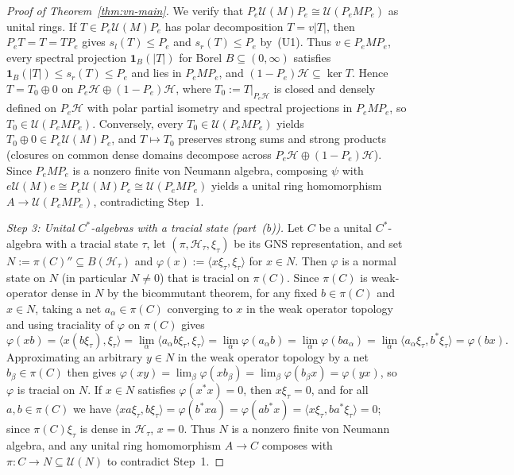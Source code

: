 \documentclass[11pt]{article}
\theoremstyle{definition}
\theoremstyle{remark}
\numberwithin{equation}{section}
\newcommand{\U}{\mathcal{U}}
\newcommand{\HH}{\mathcal{H}}
\newcommand{\1}{\mathbf{1}}
\begin{document}
\begin{proof}[Proof of Theorem~\ref{thm:vn-main}]
We verify that $P_e\U(M)P_e \cong \U(P_e M P_e)$ as unital rings. If $T \in P_e\U(M)P_e$ has polar decomposition $T = v|T|$, then $P_e T = T = T P_e$ gives $s_l(T) \le P_e$ and $s_r(T) \le P_e$ by~(U1). Thus $v \in P_e M P_e$, every spectral projection $\1_B(|T|)$ for Borel $B \subseteq (0, \infty)$ satisfies $\1_B(|T|) \le s_r(T) \le P_e$ and lies in $P_e M P_e$, and $(1 - P_e)\HH \subseteq \ker T$. Hence $T = T_0 \oplus 0$ on $P_e\HH \oplus (1 - P_e)\HH$, where $T_0 := T|_{P_e\HH}$ is closed and densely defined on $P_e\HH$ with polar partial isometry and spectral projections in $P_e M P_e$, so $T_0 \in \U(P_e M P_e)$. Conversely, every $T_0 \in \U(P_e M P_e)$ yields $T_0 \oplus 0 \in P_e\U(M)P_e$, and $T \mapsto T_0$ preserves strong sums and strong products (closures on common dense domains decompose across $P_e\HH \oplus (1 - P_e)\HH$). Since $P_e M P_e$ is a nonzero finite von Neumann algebra, composing $\psi$ with $e\U(M)e \cong P_e\U(M)P_e \cong \U(P_e M P_e)$ yields a unital ring homomorphism $A \to \U(P_e M P_e)$, contradicting Step~1.

\emph{Step 3: Unital $C^*$-algebras with a tracial state (part~(b)).}
Let $C$ be a unital $C^*$-algebra with a tracial state $\tau$, let $(\pi, \HH_\tau, \xi_\tau)$ be its GNS representation, and set $N := \pi(C)'' \subseteq B(\HH_\tau)$ and $\varphi(x) := \langle x\xi_\tau, \xi_\tau \rangle$ for $x \in N$. Then $\varphi$ is a normal state on $N$ (in particular $N \neq 0$) that is tracial on $\pi(C)$. Since $\pi(C)$ is weak-operator dense in $N$ by the bicommutant theorem, for any fixed $b \in \pi(C)$ and $x \in N$, taking a net $a_\alpha \in \pi(C)$ converging to $x$ in the weak operator topology and using traciality of $\varphi$ on $\pi(C)$ gives
\[
\varphi(xb)
= \langle x(b\xi_\tau), \xi_\tau \rangle
= \lim_\alpha \langle a_\alpha b\xi_\tau, \xi_\tau \rangle
= \lim_\alpha \varphi(a_\alpha b)
= \lim_\alpha \varphi(b a_\alpha)
= \lim_\alpha \langle a_\alpha \xi_\tau, b^*\xi_\tau \rangle
= \varphi(bx).
\]
Approximating an arbitrary $y \in N$ in the weak operator topology by a net $b_\beta \in \pi(C)$ then gives $\varphi(xy) = \lim_\beta \varphi(x b_\beta) = \lim_\beta \varphi(b_\beta x) = \varphi(yx)$, so $\varphi$ is tracial on $N$. If $x \in N$ satisfies $\varphi(x^*x) = 0$, then $x\xi_\tau = 0$, and for all $a, b \in \pi(C)$ we have $\langle x a\xi_\tau, b\xi_\tau \rangle = \varphi(b^* x a) = \varphi(a b^* x) = \langle x\xi_\tau, b a^* \xi_\tau \rangle = 0$; since $\pi(C)\xi_\tau$ is dense in $\HH_\tau$, $x = 0$. Thus $N$ is a nonzero finite von Neumann algebra, and any unital ring homomorphism $A \to C$ composes with $\pi\colon C \to N \subseteq \U(N)$ to contradict Step~1.


\end{proof}
\end{document}
